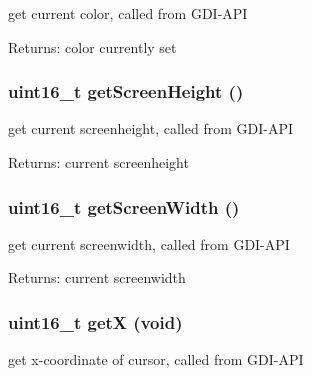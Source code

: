 get current color, called from GDI-API 

\begin{Desc}
\item[Returns:]color currently set \end{Desc}
\hypertarget{group__graphic__device_g097b85d7f413373b20867a9415cabbed}{
\subsubsection[{getScreenHeight}]{\setlength{\rightskip}{0pt plus 5cm}uint16\_\-t getScreenHeight ()}}
\label{group__graphic__device_g097b85d7f413373b20867a9415cabbed}


get current screenheight, called from GDI-API 

\begin{Desc}
\item[Returns:]current screenheight \end{Desc}
\hypertarget{group__graphic__device_g6421d0855aedae698f7a483392ffd25c}{
\subsubsection[{getScreenWidth}]{\setlength{\rightskip}{0pt plus 5cm}uint16\_\-t getScreenWidth ()}}
\label{group__graphic__device_g6421d0855aedae698f7a483392ffd25c}


get current screenwidth, called from GDI-API 

\begin{Desc}
\item[Returns:]current screenwidth \end{Desc}
\hypertarget{group__graphic__device_g4bcab06388adcd058a24e1cac1e2e544}{
\subsubsection[{getX}]{\setlength{\rightskip}{0pt plus 5cm}uint16\_\-t getX (void)}}
\label{group__graphic__device_g4bcab06388adcd058a24e1cac1e2e544}


get x-coordinate of cursor, called from GDI-API 

